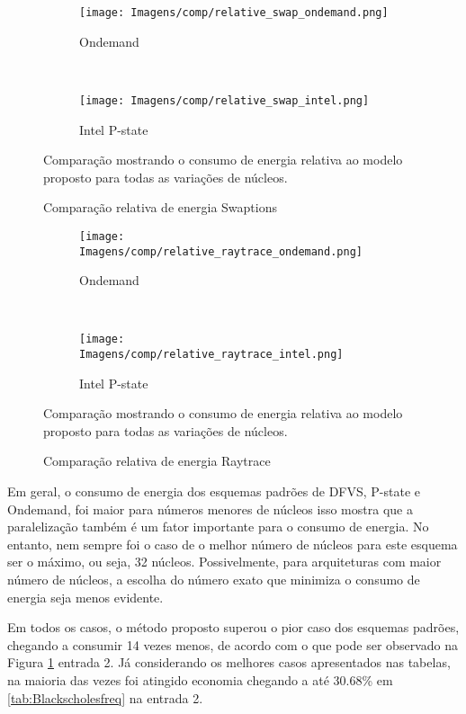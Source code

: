 \begin{figure}[H]
	\centering
	\begin{subfigure}[t]{\textwidth}
		\centering
		\texttt{[image: Imagens/comp/relative\_swap\_ondemand.png]}
		\caption{Ondemand}
	\end{subfigure}%
	\\
	\begin{subfigure}[t]{\textwidth}
		\centering
		\texttt{[image: Imagens/comp/relative\_swap\_intel.png]}
		\caption{Intel P-state}
	\end{subfigure}%
	\caption{Comparação relativa de energia Swaptions}{Comparação mostrando o consumo de energia relativa ao modelo proposto para todas as variações de núcleos.}
	\label{fig:comp_swap}
\end{figure}

\begin{figure}[H]
	\centering
	\begin{subfigure}[t]{\textwidth}
		\centering
		\texttt{[image: Imagens/comp/relative\_raytrace\_ondemand.png]}
		\caption{Ondemand}
	\end{subfigure}%
	\\
	\begin{subfigure}[t]{\textwidth}
		\centering
		\texttt{[image: Imagens/comp/relative\_raytrace\_intel.png]}
		\caption{Intel P-state}
	\end{subfigure}%
	\caption{Comparação relativa de energia Raytrace}{Comparação mostrando o consumo de energia relativa ao modelo proposto para todas as variações de núcleos.}
	\label{fig:comp_raytrace}
\end{figure}


Em geral, o consumo de energia dos esquemas padrões de DFVS, P-state e Ondemand, foi maior para números menores de núcleos isso mostra que a paralelização também é um fator importante para o consumo de energia. No entanto, nem sempre foi o caso de o melhor número de núcleos para este esquema ser o máximo, ou seja, 32 núcleos. Possivelmente, para arquiteturas com maior número de núcleos, a escolha do número exato que minimiza o consumo de energia seja menos evidente.

Em todos os casos, o método proposto superou o pior caso dos esquemas padrões, chegando a consumir 14 vezes menos, de acordo com o que pode ser observado na Figura \ref{fig:comp_swap} entrada 2. Já considerando os melhores casos apresentados nas tabelas, na maioria das vezes foi atingido economia chegando a até 30.68\% em \ref{tab:Blackscholesfreq} na entrada 2.

